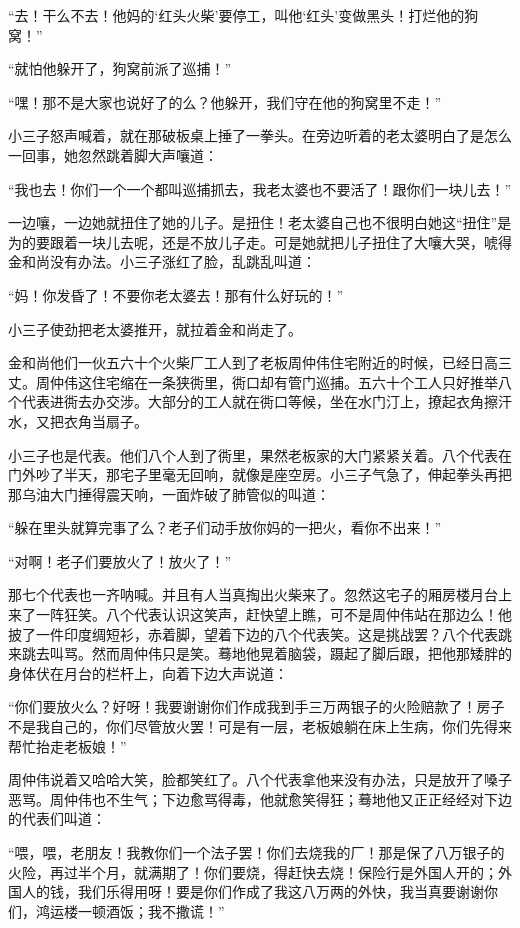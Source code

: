 \par “去！干么不去！他妈的‘红头火柴’要停工，叫他‘红头’变做黑头！打烂他的狗窝！”
\par “就怕他躲开了，狗窝前派了巡捕！”
\par “嘿！那不是大家也说好了的么？他躲开，我们守在他的狗窝里不走！”
\par 小三子怒声喊着，就在那破板桌上捶了一拳头。在旁边听着的老太婆明白了是怎么一回事，她忽然跳着脚大声嚷道：
\par “我也去！你们一个一个都叫巡捕抓去，我老太婆也不要活了！跟你们一块儿去！”
\par 一边嚷，一边她就扭住了她的儿子。是扭住！老太婆自己也不很明白她这“扭住”是为的要跟着一块儿去呢，还是不放儿子走。可是她就把儿子扭住了大嚷大哭，唬得金和尚没有办法。小三子涨红了脸，乱跳乱叫道：
\par “妈！你发昏了！不要你老太婆去！那有什么好玩的！”
\par 小三子使劲把老太婆推开，就拉着金和尚走了。
\par 金和尚他们一伙五六十个火柴厂工人到了老板周仲伟住宅附近的时候，已经日高三丈。周仲伟这住宅缩在一条狭衖里，衖口却有管门巡捕。五六十个工人只好推举八个代表进衖去办交涉。大部分的工人就在衖口等候，坐在水门汀上，撩起衣角擦汗水，又把衣角当扇子。
\par 小三子也是代表。他们八个人到了衖里，果然老板家的大门紧紧关着。八个代表在门外吵了半天，那宅子里毫无回响，就像是座空房。小三子气急了，伸起拳头再把那乌油大门捶得震天响，一面炸破了肺管似的叫道：
\par “躲在里头就算完事了么？老子们动手放你妈的一把火，看你不出来！”
\par “对啊！老子们要放火了！放火了！”
\par 那七个代表也一齐呐喊。并且有人当真掏出火柴来了。忽然这宅子的厢房楼月台上来了一阵狂笑。八个代表认识这笑声，赶快望上瞧，可不是周仲伟站在那边么！他披了一件印度绸短衫，赤着脚，望着下边的八个代表笑。这是挑战罢？八个代表跳来跳去叫骂。然而周仲伟只是笑。蓦地他晃着脑袋，蹑起了脚后跟，把他那矮胖的身体伏在月台的栏杆上，向着下边大声说道：
\par “你们要放火么？好呀！我要谢谢你们作成我到手三万两银子的火险赔款了！房子不是我自己的，你们尽管放火罢！可是有一层，老板娘躺在床上生病，你们先得来帮忙抬走老板娘！”
\par 周仲伟说着又哈哈大笑，脸都笑红了。八个代表拿他来没有办法，只是放开了嗓子恶骂。周仲伟也不生气；下边愈骂得毒，他就愈笑得狂；蓦地他又正正经经对下边的代表们叫道：
\par “喂，喂，老朋友！我教你们一个法子罢！你们去烧我的厂！那是保了八万银子的火险，再过半个月，就满期了！你们要烧，得赶快去烧！保险行是外国人开的；外国人的钱，我们乐得用呀！要是你们作成了我这八万两的外快，我当真要谢谢你们，鸿运楼一顿酒饭；我不撒谎！”
